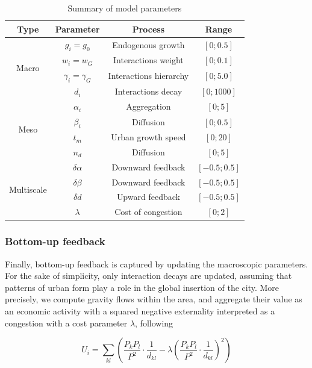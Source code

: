 \documentclass[11pt]{article}
\begin{document}
	
\begin{table}
	\caption{Summary of model parameters\label{tab:parameters}}
	\centering
	\begin{tabular}{|c|c|c|c|}
	\hline
		Type & Parameter & Process & Range \\\hline
		\multirow{4}{*}{Macro} & $g_i = g_0$ & Endogenous growth & $\left[0 ; 0.5\right]$ \\
		& $w_i = w_G$ & Interactions weight & $\left[0 ; 0.1\right]$ \\
		& $\gamma_i = \gamma_G$ & Interactions hierarchy & $\left[0 ; 5.0\right]$ \\
		& $d_i$ & Interactions decay & $\left[0 ; 1000\right]$ \\ \hline
		\multirow{4}{*}{Meso} & $\alpha_i$ & Aggregation & $\left[0 ; 5\right]$ \\
		& $\beta_i$ & Diffusion & $\left[0 ; 0.5\right]$ \\
		& $t_m$ & Urban growth speed & $\left[0 ; 20\right]$ \\
		& $n_d$ & Diffusion & $\left[0 ; 5\right]$ \\ \hline
		\multirow{4}{*}{Multiscale} & $\delta\alpha$ & Downward feedback & $\left[-0.5 ; 0.5\right]$ \\
		& $\delta\beta$ & Downward feedback & $\left[-0.5 ; 0.5\right]$ \\
		& $\delta d$ & Upward feedback & $\left[-0.5 ; 0.5\right]$ \\\hline
		& $\lambda$ & Cost of congestion & $\left[0 ; 2\right]$ \\\hline
	\end{tabular}
\end{table}
	

\subsubsection{Bottom-up feedback}
	
Finally, bottom-up feedback is captured by updating the macroscopic parameters. For the sake of simplicity, only interaction decays are updated, assuming that patterns of urban form play a role in the global insertion of the city. More precisely, we compute gravity flows within the area, and aggregate their value as an economic activity with a squared negative externality interpreted as a congestion with a cost parameter $\lambda$, following
	
\begin{equation}
\label{eq:eq6}
		U_i = \sum_{kl} \left( \frac{P_k P_l}{P^2} \cdot \frac{1}{d_{kl}} - \lambda \left(\frac{P_k P_l}{P^2} \cdot \frac{1}{d_{kl}}\right)^2 \right)
\end{equation}
	
\end{document}
